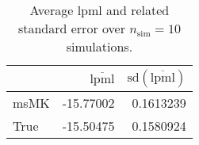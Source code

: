 \begin{table}[H]

\caption{Average lpml and related standard error over $n_{\text{sim}} = 10$ simulations.}
\centering
\begin{tabular}[t]{lrr}
\toprule
  & $\overbar{\text{lpml}}$ & $\text{sd}(\overbar{\text{lpml}})$\\
\midrule
msMK & -15.77002 & 0.1613239\\
True & -15.50475 & 0.1580924\\
\bottomrule
\end{tabular}
\end{table}
